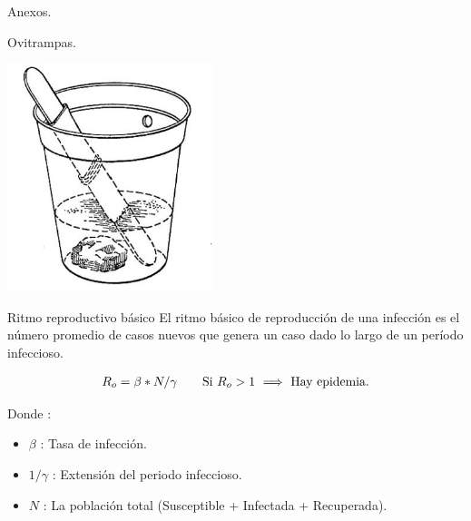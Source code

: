 \begin{frame}[c,plain]{}
    \begin{center}
    Anexos.
    \end{center}
\end{frame}



\begin{frame}[c]{Ovitrampas.}
  \begin{center}
    \includegraphics[width=6cm]{../book/capitulo-3/graphics/ovitrampa.jpg}
  \end{center}
\end{frame}

\begin{frame}[c]{Ritmo reproductivo básico}
      El ritmo básico de reproducción de una infección es el número promedio de casos nuevos que genera un caso dado lo largo de un período infeccioso.
  \begin{center}
      \begin{equation}
      \begin{array}{l l}
        R_{o} = \beta * N / \gamma & \quad \text{Si $R_{o} > 1$ $\implies$ Hay epidemia.}\\
      \end{array}
      \end{equation}
  \end{center}
  Donde :
    \begin{itemize}
      \item $\beta$ : Tasa de infección.
      \item $1/\gamma$ : Extensión del periodo infeccioso.
      \item $N$ : La población total (Susceptible + Infectada + Recuperada).
    \end{itemize}
\end{frame}

